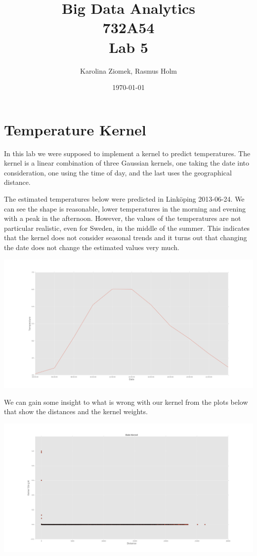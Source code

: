 \documentclass[10pt]{article}
\author{Karolina Ziomek, Rasmus Holm}
\date{\today}
\title{Big Data Analytics \\ 732A54 \\ Lab 5}
\begin{document}
\maketitle
\newpage

\section*{Temperature Kernel}
\label{sec-1}
In this lab we were supposed to implement a kernel to predict temperatures. 
The kernel is a linear combination of three Gaussian kernels, one taking the date into consideration,
one using the time of day, and the last uses the geographical distance.

The estimated temperatures below were predicted in Linköping 2013-06-24. We can see the shape is reasonable,
lower temperatures in the morning and evening with a peak in the afternoon. However, the values of the temperatures
are not particular realistic, even for Sweden, in the middle of the summer. This indicates that the kernel does
not consider seasonal trends and it turns out that changing the date does not change the estimated values very much.

\includegraphics[width=\textwidth]{./images/estimated_temps.png}

We can gain some insight to what is wrong with our kernel from the plots below that show the distances and the kernel weights.

\includegraphics[width=\textwidth]{./images/date_kernel.png}
\end{document}
